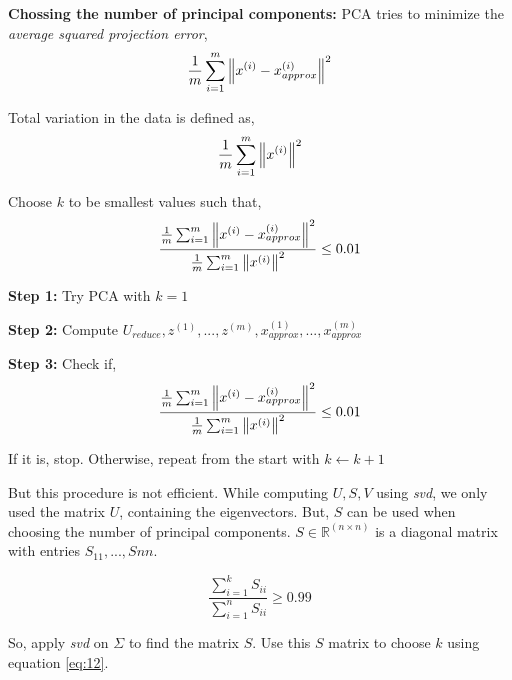 \noindent \textbf{Chossing the number of principal components: }
\noindent PCA tries to minimize the \emph{average squared projection error},
\begin{equation}
	\frac{1}{m} \sum_{i=1}^{m} \norm{x^{(i)} - x_{approx}^{(i)}}^2
\end{equation}

\noindent Total variation in the data is defined as,
\begin{equation}
	\frac{1}{m} \sum_{i=1}^{m} \norm{x^{(i)}}^2
\end{equation}

\noindent Choose $ k $ to be smallest values such that,
\begin{equation}
	\frac{\frac{1}{m} \sum_{i=1}^{m} \norm{x^{(i)} - x_{approx}^{(i)}}^2}
	{\frac{1}{m} \sum_{i=1}^{m} \norm{x^{(i)}}^2} \leq 0.01
\end{equation}
\noindent {}

\vspace{0.5cm}

\noindent \textbf{Step 1:} Try PCA with $ k = 1 $

\noindent \textbf{Step 2:} Compute $ U_{reduce}, z^{(1)}, ..., z^{(m)}, x_{approx}^{(1)}, ..., x_{approx}^{(m)} $

\noindent \textbf{Step 3:} Check if,
\begin{equation}
	\frac{\frac{1}{m} \sum_{i=1}^{m} \norm{x^{(i)} - x_{approx}^{(i)}}^2}
	{\frac{1}{m} \sum_{i=1}^{m} \norm{x^{(i)}}^2} \leq 0.01
\end{equation}

\noindent If it is, stop. Otherwise, repeat from the start with $ k \leftarrow k + 1 $

\vspace{0.5cm}

\noindent But this procedure is not efficient. While computing $ U, S, V $ using \emph{svd}, we only used
the matrix $ U $, containing the eigenvectors. But, $ S $ can be used when choosing the number of principal
components. $ S \in \mathbb{R}^{(n \times n)} $ is a diagonal matrix with entries $ S_{11} ,..., S{nn} $.

\begin{equation}
	\frac{\sum_{i=1}^{k} S_{ii}}{\sum_{i=1}^{n} S_{ii}} \geq 0.99
	\label{eq:12}
\end{equation}

\noindent So, apply \emph{svd} on $ \Sigma $ to find the matrix $ S $. Use this $ S $ matrix to choose $ k $
using equation \ref{eq:12}.


